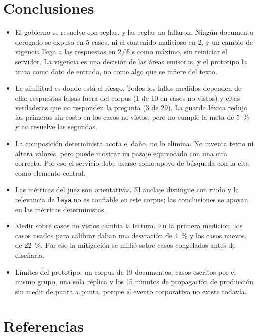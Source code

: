\section{Conclusiones}

\begin{itemize}
  \item El gobierno se resuelve con reglas, y las reglas no fallaron. Ningún documento derogado se expuso en 5 casos, ni el contenido malicioso en 2, y un cambio de vigencia llega a las respuestas en 2,05 s como máximo, sin reiniciar el servidor. La vigencia es una decisión de las áreas emisoras, y el prototipo la trata como dato de entrada, no como algo que se infiere del texto.
  \item La similitud es donde está el riesgo. Todos los fallos medidos dependen de ella: respuestas falsas fuera del corpus (1 de 10 en casos no vistos) y citas verdaderas que no responden la pregunta (3 de 29). La guarda léxica redujo las primeras sin costo en los casos no vistos, pero no cumple la meta de 5~\% y no resuelve las segundas.
  \item La composición determinista acota el daño, no lo elimina. No inventa texto ni altera valores, pero puede mostrar un pasaje equivocado con una cita correcta. Por eso el servicio debe usarse como apoyo de búsqueda con la cita como elemento central.
  \item Las métricas del juez son orientativas. El anclaje distingue con ruido y la relevancia de \texttt{laya} no es confiable en este corpus; las conclusiones se apoyan en las métricas deterministas.
  \item Medir sobre casos no vistos cambia la lectura. En la primera medición, los casos usados para calibrar daban una desviación de 4~\% y los casos nuevos, de 22~\%. Por eso la mitigación se midió sobre casos congelados antes de diseñarla.
  \item Límites del prototipo: un corpus de 19 documentos, casos escritos por el mismo grupo, una sola réplica y los 15 minutos de propagación de producción sin medir de punta a punta, porque el evento corporativo no existe todavía.
\end{itemize}

\section{Referencias}

